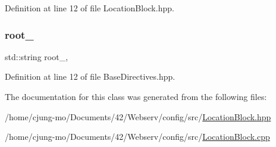 Definition at line 12 of file Location\+Block.\+hpp.

\mbox{\label{classft_1_1_base_directives_abb1eaf0bba10b90172d6152e69457dc7}} 
\subsubsection{\texorpdfstring{root\+\_\+}{root\_}}
{\footnotesize\ttfamily std\+::string root\+\_\+\hspace{0.3cm}{\ttfamily [protected]}, {\ttfamily [inherited]}}



Definition at line 12 of file Base\+Directives.\+hpp.



The documentation for this class was generated from the following files\+:\begin{DoxyCompactItemize}
\item 
/home/cjung-\/mo/\+Documents/42/\+Webserv/config/src/\hyperlink{_location_block_8hpp}{Location\+Block.\+hpp}\item 
/home/cjung-\/mo/\+Documents/42/\+Webserv/config/src/\hyperlink{_location_block_8cpp}{Location\+Block.\+cpp}\end{DoxyCompactItemize}

